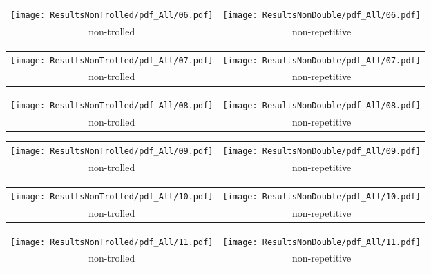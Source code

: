\begin{tabular}{cc}
{  \texttt{[image: ResultsNonTrolled/pdf\_All/06.pdf]} } & 
{  \texttt{[image: ResultsNonDouble/pdf\_All/06.pdf]}} \\
 non-trolled & non-repetitive \\
\end{tabular}

\begin{tabular}{cc}
{  \texttt{[image: ResultsNonTrolled/pdf\_All/07.pdf]} } & 
{  \texttt{[image: ResultsNonDouble/pdf\_All/07.pdf]}} \\
 non-trolled & non-repetitive \\
\end{tabular}

\begin{tabular}{cc}
{  \texttt{[image: ResultsNonTrolled/pdf\_All/08.pdf]} } & 
{  \texttt{[image: ResultsNonDouble/pdf\_All/08.pdf]}} \\
 non-trolled & non-repetitive \\
\end{tabular}

\begin{tabular}{cc}
{  \texttt{[image: ResultsNonTrolled/pdf\_All/09.pdf]} } & 
{  \texttt{[image: ResultsNonDouble/pdf\_All/09.pdf]}} \\
 non-trolled & non-repetitive \\
\end{tabular}

\begin{tabular}{cc}
{  \texttt{[image: ResultsNonTrolled/pdf\_All/10.pdf]} } & 
{  \texttt{[image: ResultsNonDouble/pdf\_All/10.pdf]}} \\
 non-trolled & non-repetitive \\
\end{tabular}

\begin{tabular}{cc}
{  \texttt{[image: ResultsNonTrolled/pdf\_All/11.pdf]} } & 
{  \texttt{[image: ResultsNonDouble/pdf\_All/11.pdf]}} \\
 non-trolled & non-repetitive \\
\end{tabular}

